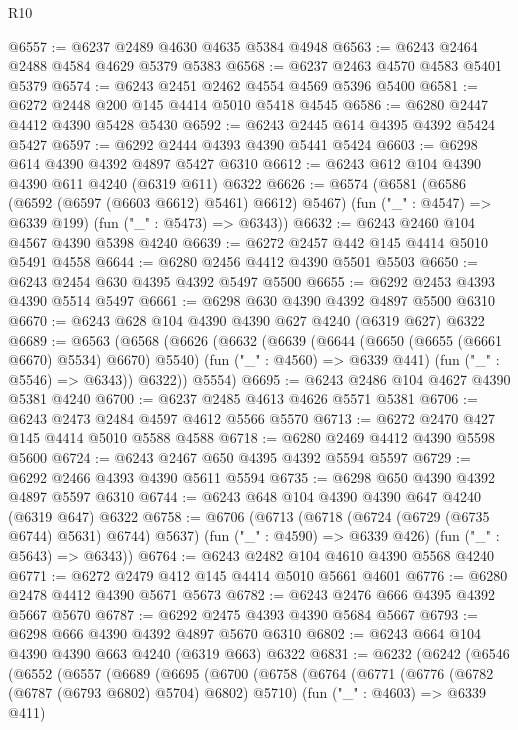 \begin{lexlean}{R10}
\begin{coremodule}
@6557 := @6237 @2489 @4630 @4635 @5384 @4948
@6563 := @6243 @2464 @2488 @4584 @4629 @5379 @5383
@6568 := @6237 @2463 @4570 @4583 @5401 @5379
@6574 := @6243 @2451 @2462 @4554 @4569 @5396 @5400
@6581 := @6272 @2448 @200 @145 @4414 @5010 @5418 @4545
@6586 := @6280 @2447 @4412 @4390 @5428 @5430
@6592 := @6243 @2445 @614 @4395 @4392 @5424 @5427
@6597 := @6292 @2444 @4393 @4390 @5441 @5424
@6603 := @6298 @614 @4390 @4392 @4897 @5427 @6310
@6612 := @6243 @612 @104 @4390 @4390 @611 @4240 (@6319 @611) @6322
@6626 := @6574
    (@6581
      (@6586 (@6592 (@6597 (@6603 @6612) @5461) @6612) @5467)
      (fun ("_" : @4547) => @6339 @199)
      (fun ("_" : @5473) => @6343))
@6632 := @6243 @2460 @104 @4567 @4390 @5398 @4240
@6639 := @6272 @2457 @442 @145 @4414 @5010 @5491 @4558
@6644 := @6280 @2456 @4412 @4390 @5501 @5503
@6650 := @6243 @2454 @630 @4395 @4392 @5497 @5500
@6655 := @6292 @2453 @4393 @4390 @5514 @5497
@6661 := @6298 @630 @4390 @4392 @4897 @5500 @6310
@6670 := @6243 @628 @104 @4390 @4390 @627 @4240 (@6319 @627) @6322
@6689 := @6563
    (@6568
      (@6626
        (@6632
          (@6639
            (@6644 (@6650 (@6655 (@6661 @6670) @5534) @6670) @5540)
            (fun ("_" : @4560) => @6339 @441)
            (fun ("_" : @5546) => @6343))
          @6322))
      @5554)
@6695 := @6243 @2486 @104 @4627 @4390 @5381 @4240
@6700 := @6237 @2485 @4613 @4626 @5571 @5381
@6706 := @6243 @2473 @2484 @4597 @4612 @5566 @5570
@6713 := @6272 @2470 @427 @145 @4414 @5010 @5588 @4588
@6718 := @6280 @2469 @4412 @4390 @5598 @5600
@6724 := @6243 @2467 @650 @4395 @4392 @5594 @5597
@6729 := @6292 @2466 @4393 @4390 @5611 @5594
@6735 := @6298 @650 @4390 @4392 @4897 @5597 @6310
@6744 := @6243 @648 @104 @4390 @4390 @647 @4240 (@6319 @647) @6322
@6758 := @6706
    (@6713
      (@6718 (@6724 (@6729 (@6735 @6744) @5631) @6744) @5637)
      (fun ("_" : @4590) => @6339 @426)
      (fun ("_" : @5643) => @6343))
@6764 := @6243 @2482 @104 @4610 @4390 @5568 @4240
@6771 := @6272 @2479 @412 @145 @4414 @5010 @5661 @4601
@6776 := @6280 @2478 @4412 @4390 @5671 @5673
@6782 := @6243 @2476 @666 @4395 @4392 @5667 @5670
@6787 := @6292 @2475 @4393 @4390 @5684 @5667
@6793 := @6298 @666 @4390 @4392 @4897 @5670 @6310
@6802 := @6243 @664 @104 @4390 @4390 @663 @4240 (@6319 @663) @6322
@6831 := @6232
    (@6242
      (@6546
        (@6552
          (@6557
            (@6689
              (@6695
                (@6700
                  (@6758
                    (@6764
                      (@6771
                        (@6776 (@6782 (@6787 (@6793 @6802) @5704) @6802) @5710)
                        (fun ("_" : @4603) => @6339 @411)

\end{coremodule}
\end{lexlean}
